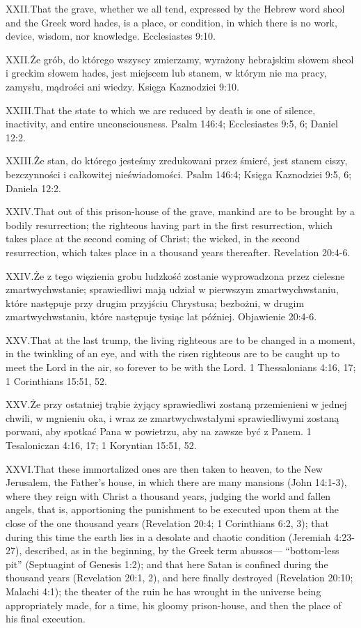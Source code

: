 \lettrine{XXII.} That the grave, whether we all tend, expressed by the Hebrew word sheol and the Greek word hades, is a place, or condition, in which there is no work, device, wisdom, nor knowledge. Ecclesiastes 9:10.


\lettrine{XXII.} Że grób, do którego wszyscy zmierzamy, wyrażony hebrajskim słowem sheol i greckim słowem hades, jest miejscem lub stanem, w którym nie ma pracy, zamysłu, mądrości ani wiedzy. Księga Kaznodziei 9:10.


\lettrine{XXIII.} That the state to which we are reduced by death is one of silence, inactivity, and entire unconsciousness. Psalm 146:4; Ecclesiastes 9:5, 6; Daniel 12:2.


\lettrine{XXIII.} Że stan, do którego jesteśmy zredukowani przez śmierć, jest stanem ciszy, bezczynności i całkowitej nieświadomości. Psalm 146:4; Księga Kaznodziei 9:5, 6; Daniela 12:2.


\lettrine{XXIV.} That out of this prison-house of the grave, mankind are to be brought by a bodily resurrection; the righteous having part in the first resurrection, which takes place at the second coming of Christ; the wicked, in the second resurrection, which takes place in a thousand years thereafter. Revelation 20:4-6.


\lettrine{XXIV.} Że z tego więzienia grobu ludzkość zostanie wyprowadzona przez cielesne zmartwychwstanie; sprawiedliwi mają udział w pierwszym zmartwychwstaniu, które następuje przy drugim przyjściu Chrystusa; bezbożni, w drugim zmartwychwstaniu, które następuje tysiąc lat później. Objawienie 20:4-6.


\lettrine{XXV.} That at the last trump, the living righteous are to be changed in a moment, in the twinkling of an eye, and with the risen righteous are to be caught up to meet the Lord in the air, so forever to be with the Lord. 1 Thessalonians 4:16, 17; 1 Corinthians 15:51, 52.


\lettrine{XXV.} Że przy ostatniej trąbie żyjący sprawiedliwi zostaną przemienieni w jednej chwili, w mgnieniu oka, i wraz ze zmartwychwstałymi sprawiedliwymi zostaną porwani, aby spotkać Pana w powietrzu, aby na zawsze być z Panem. 1 Tesaloniczan 4:16, 17; 1 Koryntian 15:51, 52.


\lettrine{XXVI.} That these immortalized ones are then taken to heaven, to the New Jerusalem, the Father’s house, in which there are many mansions (John 14:1-3), where they reign with Christ a thousand years, judging the world and fallen angels, that is, apportioning the punishment to be executed upon them at the close of the one thousand years (Revelation 20:4; 1 Corinthians 6:2, 3); that during this time the earth lies in a desolate and chaotic condition (Jeremiah 4:23-27), described, as in the beginning, by the Greek term abussos— “bottom-less pit” (Septuagint of Genesis 1:2); and that here Satan is confined during the thousand years (Revelation 20:1, 2), and here finally destroyed (Revelation 20:10; Malachi 4:1); the theater of the ruin he has wrought in the universe being appropriately made, for a time, his gloomy prison-house, and then the place of his final execution.


